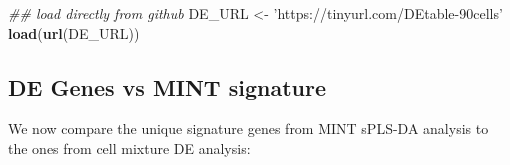 \documentclass[]{book}
\newenvironment{Shaded}{\begin{snugshade}}{\end{snugshade}}
\newcommand{\CommentTok}[1]{\textcolor[rgb]{0.56,0.35,0.01}{\textit{#1}}}
\newcommand{\KeywordTok}[1]{\textcolor[rgb]{0.13,0.29,0.53}{\textbf{#1}}}
\newcommand{\NormalTok}[1]{#1}
\newcommand{\StringTok}[1]{\textcolor[rgb]{0.31,0.60,0.02}{#1}}
\theoremstyle{definition}
\theoremstyle{definition}
\theoremstyle{definition}
\theoremstyle{remark}
\begin{document}
\begin{Shaded}
\begin{Highlighting}[]
\CommentTok{## load directly from github}
\NormalTok{DE_URL <-}\StringTok{ 'https://tinyurl.com/DEtable-90cells'}
\KeywordTok{load}\NormalTok{(}\KeywordTok{url}\NormalTok{(DE_URL))}
\end{Highlighting}
\end{Shaded}

\hypertarget{de-genes-vs-mint-signature}{%
\subsection{DE Genes vs MINT
signature}\label{de-genes-vs-mint-signature}}

We now compare the unique signature genes from MINT sPLS-DA analysis to
the ones from cell mixture DE analysis:
\end{document}
